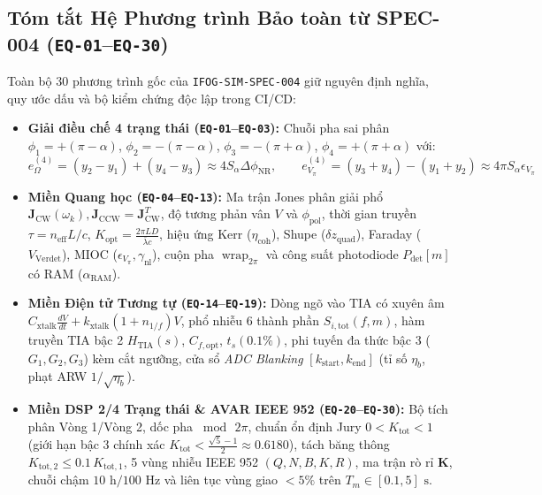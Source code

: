 \documentclass[11pt, a4paper]{article}
\begin{document}
\subsection{Tóm tắt Hệ Phương trình Bảo toàn từ SPEC-004 (\texttt{EQ-01}--\texttt{EQ-30})}
Toàn bộ 30 phương trình gốc của \texttt{IFOG-SIM-SPEC-004} giữ nguyên định nghĩa, quy ước dấu và bộ kiểm chứng độc lập trong CI/CD:
\begin{itemize}
    \item \textbf{Giải điều chế 4 trạng thái (\texttt{EQ-01}--\texttt{EQ-03}):} Chuỗi pha sai phân $\phi_1 = +(\pi-\alpha)$, $\phi_2 = -(\pi-\alpha)$, $\phi_3 = -(\pi+\alpha)$, $\phi_4 = +(\pi+\alpha)$ với:
    \begin{equation}
    e_\Omega^{(4)} = (y_2 - y_1) + (y_4 - y_3) \approx 4 S_\alpha \Delta\phi_{\text{NR}}, \qquad
    e_{V_\pi}^{(4)} = (y_3 + y_4) - (y_1 + y_2) \approx 4\pi S_\alpha \epsilon_{V_\pi}
    \end{equation}
    \item \textbf{Miền Quang học (\texttt{EQ-04}--\texttt{EQ-13}):} Ma trận Jones phân giải phổ $\mathbf{J}_{\text{CW}}(\omega_k), \mathbf{J}_{\text{CCW}} = \mathbf{J}_{\text{CW}}^T$, độ tương phản vân $V$ và $\phi_{\text{pol}}$, thời gian truyền $\tau = n_{\text{eff}}L/c$, $K_{\text{opt}} = \frac{2\pi LD}{\bar{\lambda}c}$, hiệu ứng Kerr ($\eta_{\text{coh}}$), Shupe ($\delta z_{\text{quad}}$), Faraday ($V_{\text{Verdet}}$), MIOC ($\epsilon_{V_\pi}, \gamma_{\text{nl}}$), cuộn pha $\operatorname{wrap}_{2\pi}$ và công suất photodiode $P_{\text{det}}[m]$ có RAM ($\alpha_{\text{RAM}}$).
    \item \textbf{Miền Điện tử Tương tự (\texttt{EQ-14}--\texttt{EQ-19}):} Dòng ngõ vào TIA có xuyên âm $C_{\text{xtalk}}\frac{dV}{dt} + k_{\text{xtalk}}(1+n_{1/f})V$, phổ nhiễu 6 thành phần $S_{i,\text{tot}}(f,m)$, hàm truyền TIA bậc 2 $H_{\text{TIA}}(s)$, $C_{f,\text{opt}}$, $t_s(0.1\%)$, phi tuyến đa thức bậc 3 ($G_1, G_2, G_3$) kèm cắt ngưỡng, cửa sổ \emph{ADC Blanking} $[k_{\text{start}}, k_{\text{end}}]$ (tỉ số $\eta_b$, phạt ARW $1/\sqrt{\eta_b}$).
    \item \textbf{Miền DSP 2/4 Trạng thái \& AVAR IEEE 952 (\texttt{EQ-20}--\texttt{EQ-30}):} Bộ tích phân Vòng 1/Vòng 2, dốc pha $\bmod\,2\pi$, chuẩn ổn định Jury $0 < K_{\text{tot}} < 1$ (giới hạn bậc 3 chính xác $K_{\text{tot}} < \frac{\sqrt{5}-1}{2} \approx 0.6180$), tách băng thông $K_{\text{tot},2} \le 0.1\,K_{\text{tot},1}$, 5 vùng nhiễu IEEE 952 $(Q, N, B, K, R)$, ma trận rò rỉ $\mathbf{K}$, chuỗi chậm $10\text{ h}/100\text{ Hz}$ và liên tục vùng giao $<5\%$ trên $T_m \in [0.1, 5]\text{ s}$.
\end{itemize}
\end{document}
